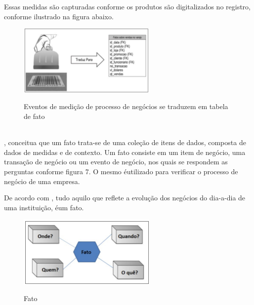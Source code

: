 Essas medidas s\~{a}o capturadas conforme os produtos s\~{a}o digitalizados no registro, conforme ilustrado na figura abaixo.

\begin{figure}[H]
	\vspace*{0,2cm}
    \centering
    \caption{Eventos de medi\c{c}\~{a}o de processo de neg\'{o}cios se traduzem em tabela de fato}
    \includegraphics[width=0.6\textwidth]{./04-figuras/figura-06}
    \label{fig:ilustfig06}
\end{figure}
\vspace*{-0,9cm}
{\raggedright {}}\\

\cite{bi-machado-2018}, conceitua que um fato trata-se de uma cole\c{c}\~{a}o de itens de dados, composta de dados de medidas e de contexto. Um fato consiste em um item de neg\'{o}cio, uma transa\c{c}\~{a}o de neg\'{o}cio ou um evento de neg\'{o}cio, nos quais se respondem as perguntas conforme figura 7. O mesmo \'{e}utilizado para verificar o processo de neg\'{o}cio de uma empresa.

De acordo com \cite{dw-kimball-1998}, tudo aquilo que reflete a evolu\c{c}\~{a}o dos neg\'{o}cios do dia-a-dia de uma institui\c{c}\~{a}o, \'{e}um fato.

\begin{figure}[H]
	\vspace*{0,2cm}
    \centering
    \caption{Fato}
    \includegraphics[width=0.6\textwidth]{./04-figuras/figura-07}
    \label{fig:ilustfig07}
\end{figure}
\vspace*{-0,9cm}
{\raggedright {}} \\

